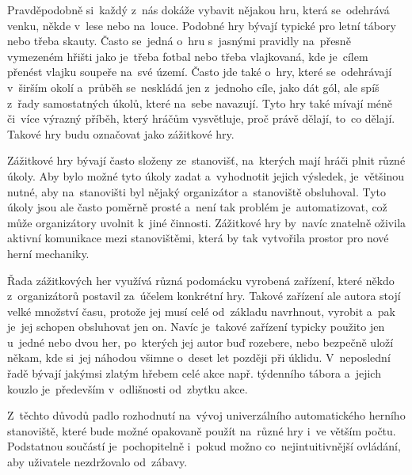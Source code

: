 Pravděpodobně si~každý z~nás dokáže vybavit nějakou hru, která se~odehrává venku, někde v~lese nebo na~louce.
Podobné hry bývají typické pro letní tábory nebo třeba skauty.
Často se~jedná o~hru s~jasnými pravidly na~přesně vymezeném hřišti jako je~třeba fotbal nebo třeba vlajkovaná, kde je~cílem přenést vlajku soupeře na~své území. 
Často jde také o~hry, které se~odehrávají v~širším okolí a~průběh se~neskládá jen z~jednoho cíle, jako dát gól, ale spíš z~řady samostatných úkolů, které na~sebe navazují.
Tyto hry také mívají méně či~více výrazný příběh, který hráčům vysvětluje, proč právě dělají, to~co dělají.
Takové hry budu označovat jako zážitkové hry.

Zážitkové hry bývají často složeny ze~stanovišť, na~kterých mají hráči plnit různé úkoly.
Aby bylo možné tyto úkoly zadat a~vyhodnotit jejich výsledek, je~většinou nutné, aby na~stanovišti byl nějaký organizátor a~stanoviště obsluhoval.
Tyto úkoly jsou ale často poměrně prosté a~není tak problém je~automatizovat, což může organizátory uvolnit k~jiné činnosti.
Zážitkové hry by~navíc znatelně oživila aktivní komunikace mezi stanovištěmi, která by tak vytvořila prostor pro nové herní mechaniky.

Řada zážitkových her využívá různá podomácku vyrobená zařízení, které někdo z~organizátorů postavil za~účelem konkrétní hry.
Takové zařízení ale autora stojí velké množství času, protože jej musí celé od~základu navrhnout, vyrobit a~pak je~jej schopen obsluhovat jen on.
Navíc je~takové zařízení typicky použito jen u~jedné nebo dvou her, po~kterých jej autor buď rozebere, nebo bezpečně uloží někam, kde si~jej náhodou všimne o~deset let později při úklidu.
V~neposlední řadě bývají jakýmsi zlatým hřebem celé akce např. týdenního tábora a~jejich kouzlo je~především v~odlišnosti od~zbytku akce.

Z~těchto důvodů padlo rozhodnutí na~vývoj univerzálního automatického herního stanoviště, které bude možné opakovaně použít na~různé hry i~ve větším počtu.
Podstatnou součástí je~pochopitelně i~pokud možno co~nejintuitivnější ovládání, aby uživatele nezdržovalo od~zábavy.





